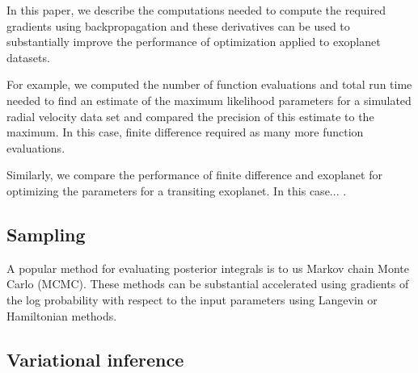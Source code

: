 \documentclass[modern]{aastex62}
\begin{document}
In this paper, we describe the computations needed to compute the required gradients using backpropagation and these derivatives can be used to substantially improve the performance of optimization applied to exoplanet datasets.


For example, we computed the number of function evaluations and total run time needed to find an estimate of the maximum likelihood parameters for a simulated radial velocity data set and compared the precision of this estimate to the  maximum.
In this case, finite difference required  as many more function evaluations.

Similarly, we compare the performance of finite difference and exoplanet for optimizing the parameters for a transiting exoplanet.
In this case... .

\subsection{Sampling}

A popular method for evaluating posterior integrals is to us Markov chain Monte Carlo (MCMC).
These methods can be substantial accelerated using gradients of the log probability with respect to the input parameters using Langevin or Hamiltonian methods.




\subsection{Variational inference}
\end{document}
